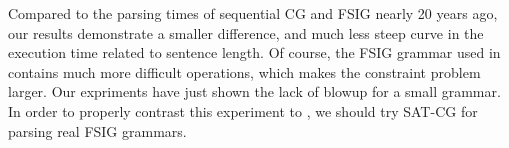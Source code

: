 Compared to the parsing times of sequential CG and FSIG nearly 20 years ago, 
our results demonstrate a smaller difference, and much less steep curve in the execution time
related to sentence length. 
Of course, the FSIG grammar used in \cite{voutilainen1998} 
contains much more difficult operations, which makes the constraint problem larger. 
Our expriments have just shown the lack of blowup for a small grammar.
In order to properly contrast this experiment to 
\cite{voutilainen1998}, we should try SAT-CG for parsing real FSIG grammars.










